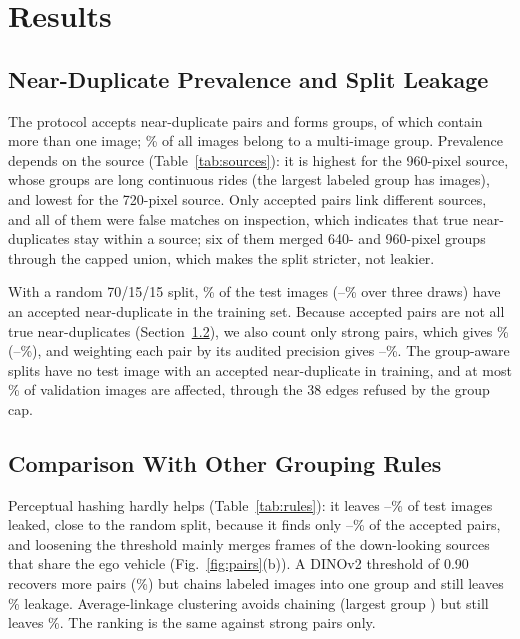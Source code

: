 \documentclass[conference,a4paper]{IEEEtran}
\begin{document}
\section{Results}
\subsection{Near-Duplicate Prevalence and Split Leakage}
The protocol accepts \NDpairs{} near-duplicate pairs and forms \NDgroups{} groups, \NDmulti{} of which contain more than one image; \NDshare\% of all images belong to a multi-image group. Prevalence depends on the source (Table~\ref{tab:sources}): it is highest for the 960-pixel source, whose groups are long continuous rides (the largest labeled group has \LargestOurs{} images), and lowest for the 720-pixel source. Only \NDcross{} accepted pairs link different sources, and all of them were false matches on inspection, which indicates that true near-duplicates stay within a source; six of them merged 640- and 960-pixel groups through the capped union, which makes the split stricter, not leakier.

With a random 70/15/15 split, \LeakRand\% of the test images (\LeakMinRand--\LeakMaxRand\% over three draws) have an accepted near-duplicate in the training set. Because accepted pairs are not all true near-duplicates (Section~\ref{sec:audit}), we also count only strong pairs, which gives \LeakRandStrong\% (\LeakRandStrongMin--\LeakRandStrongMax\%), and weighting each pair by its audited precision gives \LeakRandWLo--\LeakRandWHi\%. The group-aware splits have no test image with an accepted near-duplicate in training, and at most \LeakValGroupMax\% of validation images are affected, through the 38 edges refused by the group cap.

\subsection{Comparison With Other Grouping Rules}
\label{sec:audit}
Perceptual hashing hardly helps (Table~\ref{tab:rules}): it leaves \LeakPhTen--\LeakPhSix\% of test images leaked, close to the random split, because it finds only \RecallPhSix--\RecallPhTen\% of the accepted pairs, and loosening the threshold mainly merges frames of the down-looking sources that share the ego vehicle (Fig.~\ref{fig:pairs}(b)). A DINOv2 threshold of 0.90 recovers more pairs (\RecallCosNinety\%) but chains \LargestCosNinety{} labeled images into one group and still leaves \LeakCosNinety\% leakage. Average-linkage clustering avoids chaining (largest group \LargestAvgB) but still leaves \LeakAvgB\%. The ranking is the same against strong pairs only.
\end{document}
